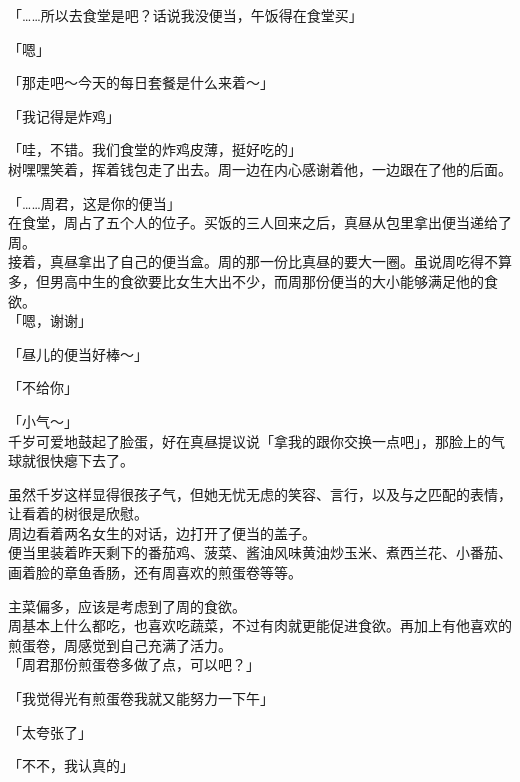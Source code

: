 「……所以去食堂是吧？话说我没便当，午饭得在食堂买」

「嗯」

「那走吧～今天的每日套餐是什么来着～」

「我记得是炸鸡」

「哇，不错。我们食堂的炸鸡皮薄，挺好吃的」\\

树嘿嘿笑着，挥着钱包走了出去。周一边在内心感谢着他，一边跟在了他的后面。\\

\vspace{2\baselineskip}

「……周君，这是你的便当」\\

在食堂，周占了五个人的位子。买饭的三人回来之后，真昼从包里拿出便当递给了周。\\

接着，真昼拿出了自己的便当盒。周的那一份比真昼的要大一圈。虽说周吃得不算多，但男高中生的食欲要比女生大出不少，而周那份便当的大小能够满足他的食欲。\\

「嗯，谢谢」

「昼儿的便当好棒～」

「不给你」

「小气～」\\

千岁可爱地鼓起了脸蛋，好在真昼提议说「拿我的跟你交换一点吧」，那脸上的气球就很快瘪下去了。

虽然千岁这样显得很孩子气，但她无忧无虑的笑容、言行，以及与之匹配的表情，让看着的树很是欣慰。\\

周边看着两名女生的对话，边打开了便当的盖子。\\

便当里装着昨天剩下的番茄鸡、菠菜、酱油风味黄油炒玉米、煮西兰花、小番茄、画着脸的章鱼香肠，还有周喜欢的煎蛋卷等等。

主菜偏多，应该是考虑到了周的食欲。\\

周基本上什么都吃，也喜欢吃蔬菜，不过有肉就更能促进食欲。再加上有他喜欢的煎蛋卷，周感觉到自己充满了活力。\\

「周君那份煎蛋卷多做了点，可以吧？」

「我觉得光有煎蛋卷我就又能努力一下午」

「太夸张了」

「不不，我认真的」\\

